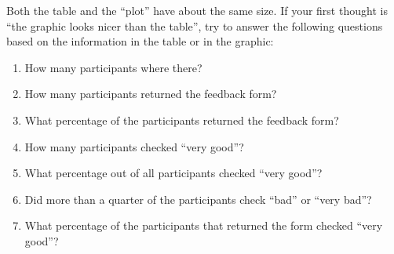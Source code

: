\bigskip
\par
{}
\bigskip

Both the table and the ``plot'' have about the same size. If your first thought
is ``the graphic looks nicer than the table'', try to answer the following
questions based on the information in the table or in the graphic:
%
\begin{enumerate}
    \item How many participants where there?
    \item How many participants returned the feedback form?
    \item What percentage of the participants returned the feedback form?
    \item How many participants checked ``very good''?
    \item What percentage out of all participants checked ``very good''?
    \item Did more than a quarter of the participants check ``bad'' or ``very
        bad''?
    \item What percentage of the participants that returned the form checked
        ``very good''?
\end{enumerate}

